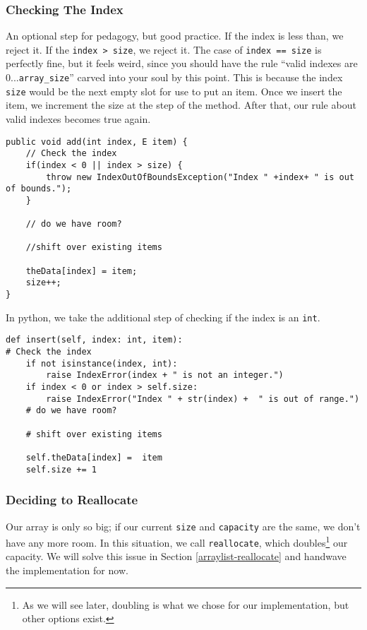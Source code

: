 \subsubsection{Checking The Index}
An optional step for pedagogy, but good practice.  If the index is less than, we reject it. 
If the \texttt{index > size}, we reject it.
The case of \texttt{index == size} is perfectly fine, but it feels weird, since you should have the rule ``valid indexes are 0...\texttt{array\_size}'' carved into your soul by this point.  
This is because the index \texttt{size} would be the next empty slot for use to put an item. 
Once we insert the item, we increment the size at the  step of the method. 
After that, our rule about valid indexes becomes true again.


\begin{verbatim}
public void add(int index, E item) {
	// Check the index
	if(index < 0 || index > size) {
		throw new IndexOutOfBoundsException("Index " +index+ " is out of bounds.");
	}
	
	// do we have room?
	
	//shift over existing items
	
	theData[index] = item;
	size++;
}
\end{verbatim}


In python, we take the additional step of checking if the index is an \texttt{int}.
\begin{verbatim}
def insert(self, index: int, item):
# Check the index
	if not isinstance(index, int):
		raise IndexError(index + " is not an integer.")
	if index < 0 or index > self.size:
		raise IndexError("Index " + str(index) +  " is out of range.")
	# do we have room?
	
	# shift over existing items
	
	self.theData[index] =  item
	self.size += 1

\end{verbatim}





\subsubsection{Deciding to Reallocate}
Our array is only so big; if our current \texttt{size} and \texttt{capacity} are the same, we don't have any more room.
In this situation, we call \texttt{reallocate}, which doubles\footnote{As we will see later, doubling is what we chose for our implementation, but other options exist.} our capacity.
We will solve this issue in Section \ref{arraylist-reallocate} and handwave the implementation for now.

